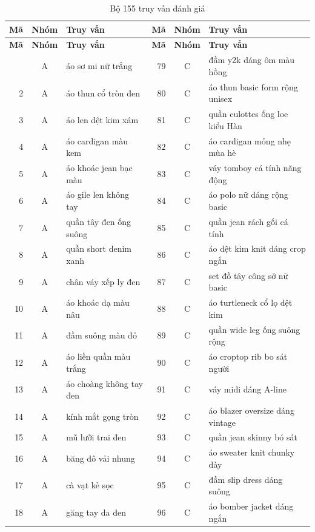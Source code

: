 \begingroup
\scriptsize
{}
\setlength{\tabcolsep}{3pt}
\renewcommand{\arraystretch}{0.95}
\begin{longtable}{@{}r c p{5.7cm} r c p{5.7cm}@{}}
\caption{Bộ 155 truy vấn đánh giá}\label{tab:pl-truy-van}\\
\toprule
\textbf{Mã} & \textbf{Nhóm} & \textbf{Truy vấn} & \textbf{Mã} & \textbf{Nhóm} & \textbf{Truy vấn} \\
\midrule
\endfirsthead
\toprule
\textbf{Mã} & \textbf{Nhóm} & \textbf{Truy vấn} & \textbf{Mã} & \textbf{Nhóm} & \textbf{Truy vấn} \\
\midrule
\endhead
\bottomrule
\endfoot
1 & A & áo sơ mi nữ trắng & 79 & C & đầm y2k dáng ôm màu hồng \\
2 & A & áo thun cổ tròn đen & 80 & C & áo thun basic form rộng unisex \\
3 & A & áo len dệt kim xám & 81 & C & quần culottes ống loe kiểu Hàn \\
4 & A & áo cardigan màu kem & 82 & C & áo cardigan mỏng nhẹ mùa hè \\
5 & A & áo khoác jean bạc màu & 83 & C & váy tomboy cá tính năng động \\
6 & A & áo gile len không tay & 84 & C & áo polo nữ dáng rộng basic \\
7 & A & quần tây đen ống suông & 85 & C & quần jean rách gối cá tính \\
8 & A & quần short denim xanh & 86 & C & áo dệt kim knit dáng crop ngắn \\
9 & A & chân váy xếp ly đen & 87 & C & set đồ tây công sở nữ basic \\
10 & A & áo khoác dạ màu nâu & 88 & C & áo turtleneck cổ lọ dệt kim \\
11 & A & đầm suông màu đỏ & 89 & C & quần wide leg ống suông rộng \\
12 & A & áo liền quần màu trắng & 90 & C & áo croptop rib bo sát người \\
13 & A & áo choàng không tay đen & 91 & C & váy midi dáng A-line \\
14 & A & kính mắt gọng tròn & 92 & C & áo blazer oversize dáng vintage \\
15 & A & mũ lưỡi trai đen & 93 & C & quần jean skinny bó sát \\
16 & A & băng đô vải nhung & 94 & C & áo sweater knit chunky dày \\
17 & A & cà vạt kẻ sọc & 95 & C & đầm slip dress dáng suông \\
18 & A & găng tay da đen & 96 & C & áo bomber jacket dáng ngắn \\

\end{longtable}
